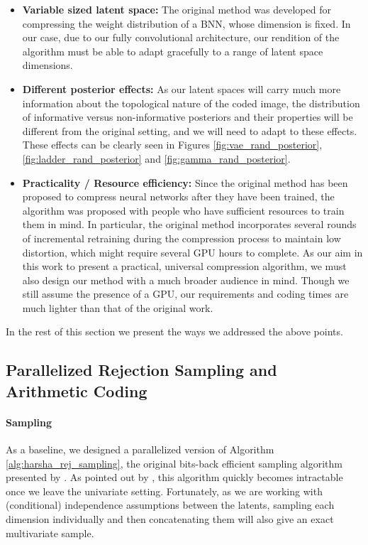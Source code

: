 \begin{itemize}
\item \textbf{Variable sized latent space:} The original method was
  developed for compressing the weight distribution of a BNN, whose dimension is
  fixed. In our case, due to our fully convolutional architecture, our rendition
  of the algorithm must be able to adapt gracefully to a range of latent space
  dimensions. 

\item \textbf{Different posterior effects:} As our latent spaces will carry much
  more information about the topological nature of the coded image, the
  distribution of informative versus non-informative posteriors and their
  properties will be different from the original setting, and we will need to
  adapt to these effects. These effects can be clearly seen in Figures
  \ref{fig:vae_rand_posterior}, \ref{fig:ladder_rand_posterior} and
  \ref{fig:gamma_rand_posterior}.

\item \textbf{Practicality / Resource efficiency:} Since the original method has
  been proposed to compress neural networks after they have been trained, the
  algorithm was proposed with people who have sufficient resources to train them
  in mind. In particular, the original method incorporates several rounds of
  incremental retraining during the compression process to maintain low distortion, which
  might require several GPU hours to complete. As our aim in this work to
  present a practical, universal compression algorithm, we must also design our
  method with a much broader audience in mind. Though we still assume the
  presence of a GPU, our requirements and coding times are much lighter than
  that of the original work.
\end{itemize}

In the rest of this section we present the ways we addressed the above points.

\subsection{Parallelized Rejection Sampling and Arithmetic Coding}

\paragraph{Sampling}
As a baseline, we designed a parallelized version of Algorithm
\ref{alg:harsha_rej_sampling}, the original bits-back efficient sampling
algorithm presented by \cite{harsha2007communication}. As pointed out by
\cite{havasi2018minimal}, this algorithm quickly becomes intractable once
we leave the univariate setting. Fortunately, as we are working with
(conditional) independence assumptions between the latents, 
sampling each dimension individually and then concatenating them will also
give an exact multivariate sample.

